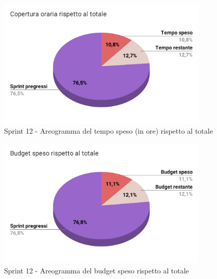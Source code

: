   \begin{figure}[H]
    \centering
    \includegraphics[width=0.90\textwidth]{assets/Consuntivo/Sprint-12/copertura_oraria.pdf}
    \caption{Sprint 12 - Areogramma del tempo speso (in ore) rispetto al totale}
  \end{figure}

  \begin{figure}[H]
    \centering
    \includegraphics[width=0.90\textwidth]{assets/Consuntivo/Sprint-12/budget_speso.pdf}
    \caption{Sprint 12 - Areogramma del budget speso rispetto al totale}
  \end{figure}

